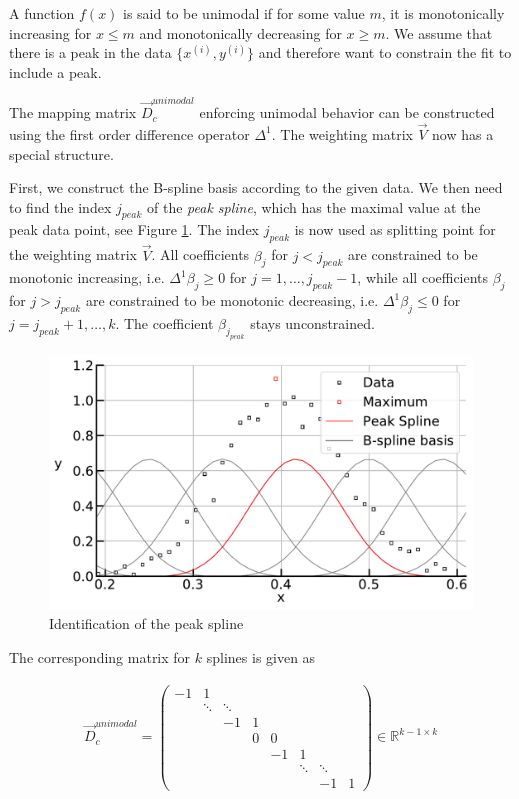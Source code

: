 \documentclass[10pt,a4paper]{report}
\begin{document}
A function $f(x)$ is said to be unimodal if for some value $m$, it is monotonically increasing for $x \le m$ and monotonically decreasing for $x \ge m$. We assume that there is a peak in the data $\{x^{(i)}, y^{(i)}\}$ and therefore want to constrain the fit to include a peak.

The mapping matrix $\vec{D}_c^{unimodal}$ enforcing unimodal behavior can be constructed using the first order difference operator $\Delta^1$. The weighting matrix $\vec{V}$ now has a special structure. 

First, we construct the B-spline basis according to the given data. We then need to find the index $j_{peak}$ of the \emph{peak spline}, which has the maximal value at the peak data point, see Figure \ref{fig:peak_spline}. The index $j_{peak}$ is now used as splitting point for the weighting matrix $\vec{V}$. All coefficients $\beta_j$ for $j < j_{peak}$ are constrained to be monotonic increasing, i.e. $\Delta^1 \beta_j \ge 0$ for $j = 1, \dots, j_{peak}-1$, while all coefficients $\beta_j$ for $j > j_{peak}$ are constrained to be monotonic decreasing, i.e. $\Delta^1 \beta_j \le 0$ for $j = j_{peak}+1, \dots, k$. The coefficient $\beta_{j_{peak}}$ stays unconstrained. \cite{eilers2005unimodal} 

\begin{figure}[H]
	\centering
	\includegraphics[width=\linewidth]{../thesisplots/peak_spline.pdf}
	\caption{Identification of the peak spline}
	\label{fig:peak_spline}
\end{figure}


The corresponding matrix for $k$ splines is given as 

\begin{align}\label{eq:D_c_unimodal}
	\vec{D}_c^{unimodal} = \begin{pmatrix} -1 & 1 \\ 
		& \ddots & \ddots  \\
		&        &     -1 & 1 & \\
		& 		  & 	   & 0 & 0 & \\ 
		&		  &		   &   &-1 & 1 \\
		&		  &		   &   &   &\ddots & \ddots \\
		& 	      &        &   &   &       &  -1    & 1
	\end{pmatrix} \in \mathbb{R}^{k-1 \times k}
\end{align}
\end{document}
